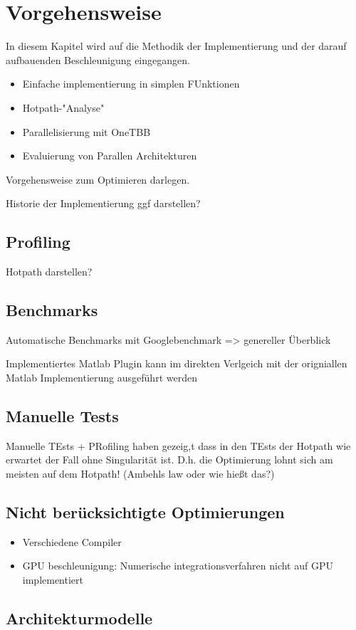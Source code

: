 \chapter{Vorgehensweise}

In diesem Kapitel wird auf die Methodik der Implementierung und der darauf aufbauenden Beschleunigung eingegangen.


\begin{itemize}
    \item Einfache implementierung in simplen FUnktionen
    \item Hotpath-"Analyse"
    \item Parallelisierung mit OneTBB
    \item Evaluierung von Parallen Architekturen
\end{itemize}

Vorgehensweise zum Optimieren darlegen.

Historie der Implementierung ggf darstellen?

\section{Profiling}

Hotpath darstellen?


\section{Benchmarks}

Automatische Benchmarks mit Googlebenchmark => genereller Überblick

Implementiertes Matlab Plugin kann im direkten Verlgeich mit der origniallen Matlab Implementierung ausgeführt werden


\section{Manuelle Tests}

Manuelle TEsts + PRofiling haben gezeig,t dass in den TEsts der Hotpath wie erwartet der Fall ohne Singularität ist.
D.h. die Optimierung lohnt sich am meisten auf dem Hotpath! (Ambehls law oder wie hießt das?)

\section{Nicht berücksichtigte Optimierungen}

\begin{itemize}
    \item Verschiedene Compiler
    \item GPU beschleunigung: Numerische integrationsverfahren nicht auf GPU implementiert
\end{itemize}

\section{Architekturmodelle}

